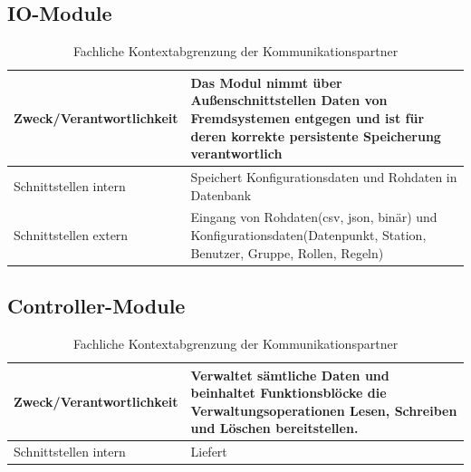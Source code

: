 \subsection{IO-Module}
\begin{table}
	\begin{tabularx}{\textwidth}{X X}
		\hline
		 Zweck/Verantwortlichkeit & Das Modul nimmt über Außenschnittstellen Daten von Fremdsystemen entgegen und ist für deren korrekte persistente Speicherung verantwortlich  \\
		 \hline
		 Schnittstellen intern & Speichert Konfigurationsdaten und Rohdaten in Datenbank \\
		 \hline
		 Schnittstellen extern & Eingang von Rohdaten(csv, json, binär) und Konfigurationsdaten(Datenpunkt, Station, Benutzer, Gruppe, Rollen, Regeln) \\
		 \hline
	\end{tabularx} 
	\caption{Fachliche Kontextabgrenzung der Kommunikationspartner}
	\label{tab:FachlicheKontextabgrenzungDerKommunikationspartner}
\end{table}

\subsection{Controller-Module}
\begin{table}[th]
	\begin{tabularx}{\textwidth}{X X}
		\hline
		Zweck/Verantwortlichkeit & Verwaltet sämtliche Daten und beinhaltet Funktionsblöcke die Verwaltungsoperationen Lesen, Schreiben und Löschen bereitstellen. \\
		\hline
		Schnittstellen intern & Liefert \\
		\hline
	\end{tabularx} 
	\caption{Fachliche Kontextabgrenzung der Kommunikationspartner}
	\label{tab:FachlicheKontextabgrenzungDerKommunikationspartner}
\end{table}


